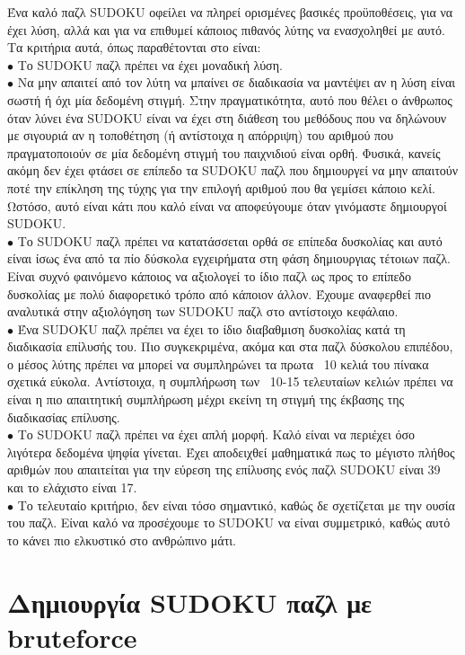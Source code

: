 \documentclass[12pt]{book}
\theoremstyle{definition}
\begin{document}
Ένα καλό παζλ SUDOKU οφείλει να πληρεί ορισμένες βασικές προϋποθέσεις, για να έχει λύση, αλλά και για να επιθυμεί κάποιος πιθανός λύτης να ενασχοληθεί με αυτό. Τα κριτήρια αυτά, όπως παραθέτονται στο \cite{9} είναι: \\
\(\bullet\) Το SUDOKU παζλ πρέπει να έχει μοναδική λύση. \\
\(\bullet\) Να μην απαιτεί από τον λύτη να μπαίνει σε διαδικασία να μαντέψει αν η λύση είναι σωστή ή όχι μία δεδομένη στιγμή. Στην πραγματικότητα, αυτό που θέλει ο άνθρωπος όταν λύνει ένα SUDOKU είναι να έχει στη διάθεση του μεθόδους που να δηλώνουν με σιγουριά αν η τοποθέτηση (ή αντίστοιχα η απόρριψη) του αριθμού  που πραγματοποιούν σε μία δεδομένη στιγμή του παιχνιδιού είναι ορθή. Φυσικά, κανείς ακόμη δεν έχει φτάσει σε επίπεδο τα SUDOKU παζλ που δημιουργεί να μην απαιτούν ποτέ την επίκληση της τύχης για την επιλογή αριθμού που θα γεμίσει κάποιο κελί. Ωστόσο, αυτό είναι κάτι που καλό είναι να αποφεύγουμε όταν γινόμαστε δημιουργοί SUDOKU. \\ 
\(\bullet\) Το SUDOKU παζλ πρέπει να κατατάσσεται ορθά σε επίπεδα δυσκολίας και αυτό είναι ίσως ένα από τα πίο δύσκολα εγχειρήματα στη φάση δημιουργιας τέτοιων παζλ. Είναι συχνό φαινόμενο κάποιος να αξιολογεί το ίδιο παζλ ως προς το επίπεδο δυσκολίας με πολύ διαφορετικό τρόπο από κάποιον άλλον. Έχουμε αναφερθεί πιο αναλυτικά στην αξιολόγηση των SUDOKU παζλ στο αντίστοιχο κεφάλαιο. \\
\(\bullet\) Ένα SUDOKU παζλ πρέπει να έχει το ίδιο διαβαθμιση δυσκολίας κατά τη διαδικασία επίλυσής του. Πιο συγκεκριμένα, ακόμα και στα παζλ δύσκολου επιπέδου, ο μέσος λύτης πρέπει να μπορεί να συμπληρώνει τα πρωτα ~10 κελιά του πίνακα σχετικά εύκολα. Αντίστοιχα, η συμπλήρωση των ~10-15 τελευταίων κελιών πρέπει να είναι η πιο απαιτητική συμπλήρωση μέχρι εκείνη τη στιγμή της έκβασης της διαδικασίας επίλυσης. \\
\(\bullet\) Το SUDOKU παζλ πρέπει να έχει απλή μορφή. Καλό είναι να περιέχει όσο λιγότερα δεδομένα ψηφία γίνεται. Έχει αποδειχθεί μαθηματικά πως το μέγιστο πλήθος αριθμών που απαιτείται για την εύρεση της επίλυσης ενός παζλ SUDOKU είναι 39 και το ελάχιστο είναι 17. \\
\(\bullet\) Το τελευταίο κριτήριο, δεν είναι τόσο σημαντικό, καθώς δε σχετίζεται με την ουσία του παζλ. Είναι καλό να προσέχουμε το SUDOKU να είναι συμμετρικό, καθώς αυτό το κάνει πιο ελκυστικό στο ανθρώπινο μάτι. \par


\section{Δημιουργία SUDOKU παζλ με bruteforce}
\end{document}
